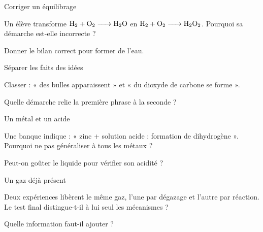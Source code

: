 \clearpage{}
\par\noindent\begin{minipage}{\linewidth}
\begin{exercice}[3]{Corriger un équilibrage}
\begin{questions}
\item Un élève transforme $\ce{H2 + O2 -> H2O}$ en $\ce{H2 + O2 -> H2O2}$. Pourquoi sa démarche est-elle incorrecte ?
\item Donner le bilan correct pour former de l’eau.
\end{questions}
\end{exercice}
\end{minipage}
\par\noindent\begin{minipage}{\linewidth}
\begin{exercice}[3]{Séparer les faits des idées}
\begin{questions}
\item Classer : « des bulles apparaissent » et « du dioxyde de carbone se forme ».
\item Quelle démarche relie la première phrase à la seconde ?
\end{questions}
\end{exercice}
\end{minipage}
\par\noindent\begin{minipage}{\linewidth}
\begin{exercice}[3]{Un métal et un acide}
\begin{questions}
\item Une banque indique : « zinc + solution acide : formation de dihydrogène ». Pourquoi ne pas généraliser à tous les métaux ?
\item Peut-on goûter le liquide pour vérifier son acidité ?
\end{questions}
\end{exercice}
\end{minipage}
\par\noindent\begin{minipage}{\linewidth}
\begin{exercice}[3]{Un gaz déjà présent}
\begin{questions}
\item Deux expériences libèrent le même gaz, l’une par dégazage et l’autre par réaction. Le test final distingue-t-il à lui seul les mécanismes ?
\item Quelle information faut-il ajouter ?
\end{questions}
\end{exercice}
\end{minipage}
